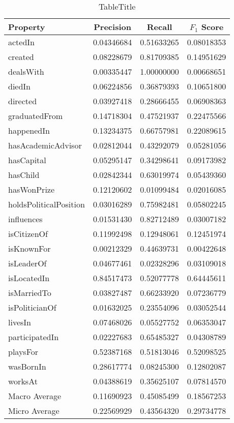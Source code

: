 \begin{sidewaystable}
    \begin{center}
        \small
        \begin{tabular}{|l||c|c||c|}
        \hline
        Property & Precision & Recall & $F_1$ Score \\ 
        \hline
        actedIn & 0.04346684 & 0.51633265 & 0.08018353 \\
        created & 0.08228679 & 0.81709385 & 0.14951629 \\
        dealsWith & 0.00335447 & 1.00000000 & 0.00668651 \\
        diedIn & 0.06224856 & 0.36879393 & 0.10651800 \\
        directed & 0.03927418 & 0.28666455 & 0.06908363 \\
        graduatedFrom & 0.14718304 & 0.47521937 & 0.22475566 \\
        happenedIn & 0.13234375 & 0.66757981 & 0.22089615 \\
        hasAcademicAdvisor & 0.02812044 & 0.43292079 & 0.05281056 \\
        hasCapital & 0.05295147 & 0.34298641 & 0.09173982 \\
        hasChild & 0.02842344 & 0.63019974 & 0.05439360 \\
        hasWonPrize & 0.12120602 & 0.01099484 & 0.02016085 \\
        holdsPoliticalPosition & 0.03016289 & 0.75982481 & 0.05802245 \\
        influences & 0.01531430 & 0.82712489 & 0.03007182 \\
        isCitizenOf & 0.11992498 & 0.12948061 & 0.12451974 \\
        isKnownFor & 0.00212329 & 0.44639731 & 0.00422648 \\
        isLeaderOf & 0.04677461 & 0.02328296 & 0.03109018 \\
        isLocatedIn & 0.84517473 & 0.52077778 & 0.64445611 \\
        isMarriedTo & 0.03827487 & 0.66233920 & 0.07236779 \\
        isPoliticianOf & 0.01632025 & 0.23554096 & 0.03052544 \\
        livesIn & 0.07468026 & 0.05527752 & 0.06353047 \\
        participatedIn & 0.02227683 & 0.65485327 & 0.04308789 \\
        playsFor & 0.52387168 & 0.51813046 & 0.52098525 \\
        wasBornIn & 0.28617774 & 0.08245300 & 0.12802087 \\
        worksAt & 0.04388619 & 0.35625107 & 0.07814570 \\
        \hline
        Macro Average & 0.11690923 & 0.45085499 & 0.18567253 \\
        Micro Average & 0.22569929 & 0.43564320 & 0.29734778 \\
        \hline
        \end{tabular}
        \caption{TableTitle}
        \label{t:baseline-1}
    \end{center}
\end{sidewaystable}
